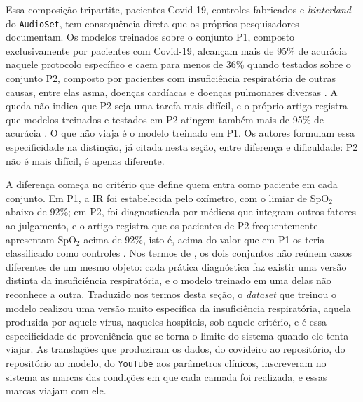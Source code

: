 Essa composição tripartite, pacientes Covid-19, controles fabricados e \textit{hinterland} do \texttt{AudioSet}, tem consequência direta que os próprios pesquisadores documentam. Os modelos treinados sobre o conjunto P1, composto exclusivamente por pacientes com Covid-19, alcançam mais de 95\% de acurácia naquele protocolo específico e caem para menos de 36\% quando testados sobre o conjunto P2, composto por pacientes com insuficiência respiratória de outras causas, entre elas asma, doenças cardíacas e doenças pulmonares diversas \parencite{Gauy2024Discriminant}. A queda não indica que P2 seja uma tarefa mais difícil, e o próprio artigo registra que modelos treinados e testados em P2 atingem também mais de 95\% de acurácia \parencite{Gauy2024Discriminant}. O que não viaja é o modelo treinado em P1. Os autores formulam essa especificidade na distinção, já citada nesta seção, entre diferença e dificuldade: P2 não é mais difícil, é apenas diferente.

A diferença começa no critério que define quem entra como paciente em cada conjunto. Em P1, a IR foi estabelecida pelo oxímetro, com o limiar de SpO$_2$ abaixo de 92\%; em P2, foi diagnosticada por médicos que integram outros fatores ao julgamento, e o artigo registra que os pacientes de P2 frequentemente apresentam SpO$_2$ acima de 92\%, isto é, acima do valor que em P1 os teria classificado como controles \parencite{Gauy2024Discriminant}. Nos termos de \textcite{mol2002body}, os dois conjuntos não reúnem casos diferentes de um mesmo objeto: cada prática diagnóstica faz existir uma versão distinta da insuficiência respiratória, e o modelo treinado em uma delas não reconhece a outra. Traduzido nos termos desta seção, o \textit{dataset} que treinou o modelo realizou uma versão muito específica da insuficiência respiratória, aquela produzida por aquele vírus, naqueles hospitais, sob aquele critério, e é essa especificidade de proveniência que se torna o limite do sistema quando ele tenta viajar. As translações que produziram os dados, do covideiro ao repositório, do repositório ao modelo, do \texttt{YouTube} aos parâmetros clínicos, inscreveram no sistema as marcas das condições em que cada camada foi realizada, e essas marcas viajam com ele.

